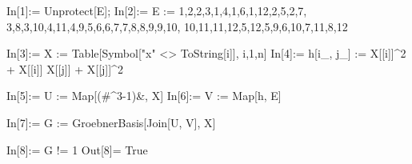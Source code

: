 \begin{python}
In[1]:= Unprotect[E];
In[2]:= E := {{1,2},{2,3},{1,4},{1,6},{1,12},{2,5},{2,7},
{3,8},{3,10},{4,11},{4,9},{5,6},{6,7},{7,8},{8,9},{9,10},
{10,11},{11,12},{5,12},{5,9},{6,10},{7,11},{8,12}}

In[3]:= X := Table[Symbol["x" <> ToString[i]], {i,1,n}]
In[4]:= h[{i_, j_}] := X[[i]]^2 + X[[i]] X[[j]] + X[[j]]^2

In[5]:= U := Map[(#^3-1)&, X]
In[6]:= V := Map[h, E]

In[7]:= G := GroebnerBasis[Join[U, V], X]

In[8]:= G != {1}
Out[8]= True
\end{python}

